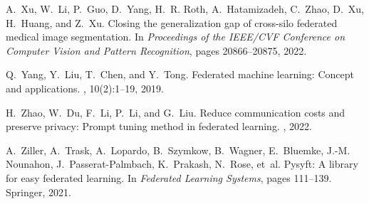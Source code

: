 \documentclass[11pt]{article}
\begin{document}
\begin{thebibliography}{10}
A.~Xu, W.~Li, P.~Guo, D.~Yang, H.~R. Roth, A.~Hatamizadeh, C.~Zhao, D.~Xu,
  H.~Huang, and Z.~Xu.
\newblock Closing the generalization gap of cross-silo federated medical image
  segmentation.
\newblock In {\em Proceedings of the IEEE/CVF Conference on Computer Vision and
  Pattern Recognition}, pages 20866--20875, 2022.

Q.~Yang, Y.~Liu, T.~Chen, and Y.~Tong.
\newblock Federated machine learning: Concept and applications.
,
  10(2):1--19, 2019.

H.~Zhao, W.~Du, F.~Li, P.~Li, and G.~Liu.
\newblock Reduce communication costs and preserve privacy: Prompt tuning method
  in federated learning.
, 2022.

A.~Ziller, A.~Trask, A.~Lopardo, B.~Szymkow, B.~Wagner, E.~Bluemke, J.-M.
  Nounahon, J.~Passerat-Palmbach, K.~Prakash, N.~Rose, et~al.
\newblock Pysyft: A library for easy federated learning.
\newblock In {\em Federated Learning Systems}, pages 111--139. Springer, 2021.

\end{thebibliography}








\end{document}
